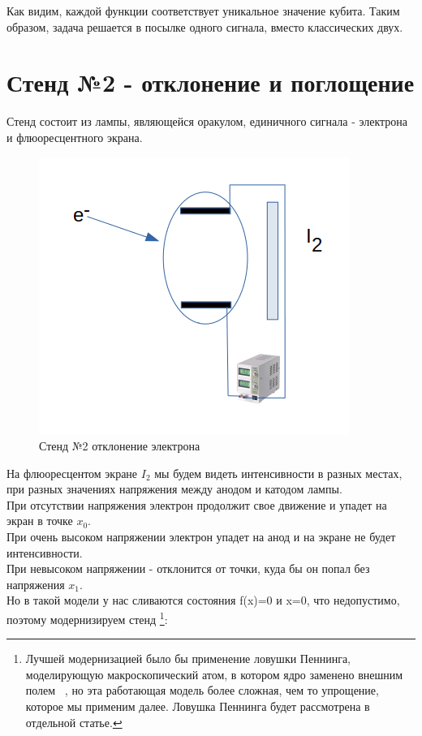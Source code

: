 \documentclass[11pt]{article}
\begin{document}
Как видим, каждой функции соответствует уникальное значение кубита. Таким образом, задача решается в посылке одного сигнала, вместо классических двух.

\section{Стенд №2 - отклонение и поглощение}

Стенд состоит из лампы, являющейся оракулом, единичного сигнала - электрона и флюоресцентного экрана. \\
 
\begin{figure}[htp]
\centering
\includegraphics[scale=0.40]{st2.png}
\caption{Стенд №2 отклонение электрона}
\label{}
\end{figure}

На флюоресцентом экране $I_2$ мы будем видеть интенсивности в разных местах, при разных значениях напряжения между анодом и катодом лампы. \\
При отсутствии напряжения электрон продолжит свое движение и упадет на экран в точке $x_0$. \\
При очень высоком напряжении электрон упадет на анод и на экране не будет интенсивности. \\
При невысоком напряжении - отклонится от точки, куда бы он попал без напряжения $x_1$. \\

 Но в такой модели у нас сливаются состояния f(x)=0 и x=0, что недопустимо, поэтому модернизируем стенд \footnote{Лучшей модернизацией было бы применение ловушки Пеннинга, моделирующую макроскопический атом, в котором ядро заменено внешним полем  ~\cite{Ekstrom}, но эта работающая модель более сложная, чем то упрощение, которое мы применим далее. Ловушка Пеннинга будет рассмотрена в отдельной статье.}:
\end{document}
